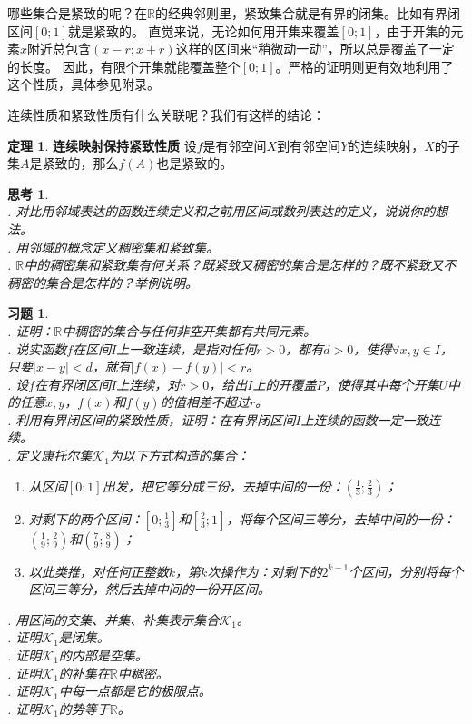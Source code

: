\documentclass[12pt,UTF8]{ctexbook}
\theoremstyle{definition}
\newtheorem{tm}{定理}[section]
\theoremstyle{plain}
\newtheorem{sk}{思考}[section]
\newtheorem{xt}{习题}[section]
\begin{document}
哪些集合是紧致的呢？在$\mathbb{R}$的经典邻则里，紧致集合就是有界的闭集。比如有界闭区间$[0;1]$就是紧致的。
直觉来说，无论如何用开集来覆盖$[0;1]$，由于开集的元素$x$附近总包含$(x-r;x+r)$这样的区间来“稍微动一动”，所以总是覆盖了一定的长度。
因此，有限个开集就能覆盖整个$[0;1]$。严格的证明则更有效地利用了这个性质，具体参见附录。

连续性质和紧致性质有什么关联呢？我们有这样的结论：
\begin{tm}{\textbf{连续映射保持紧致性质}}
    设$f$是有邻空间$X$到有邻空间$Y$的连续映射，$X$的子集$A$是紧致的，那么$f(A)$也是紧致的。
\end{tm}

\begin{sk}
    \mbox{} \\
    . 对比用邻域表达的函数连续定义和之前用区间或数列表达的定义，说说你的想法。\\
    . 用邻域的概念定义稠密集和紧致集。\\
    . $\mathbb{R}$中的稠密集和紧致集有何关系？既紧致又稠密的集合是怎样的？既不紧致又不稠密的集合是怎样的？举例说明。
\end{sk}

\begin{xt}
    \mbox{} \\
    . 证明：$\mathbb{R}$中稠密的集合与任何非空开集都有共同元素。\\
    . 说实函数$f$在区间$I$上一致连续，是指对任何$r>0$，都有$d>0$，使得$\forall x, y\in I$，只要$|x-y|<d$，就有$|f(x) - f(y)| < r$。\\
    . 设$f$在有界闭区间$I$上连续，对$r>0$，给出$I$上的开覆盖$P$，使得其中每个开集$U$中的任意$x,y$，$f(x)$和$f(y)$的值相差不超过$r$。\\
    . 利用有界闭区间的紧致性质，证明：在有界闭区间$I$上连续的函数一定一致连续。\\
    . 定义康托尔集$\mathcal{K}_1$为以下方式构造的集合：
    \begin{enumerate}
        \item 从区间$[0;1]$出发，把它等分成三份，去掉中间的一份：$\left(\frac{1}{3};\frac{2}{3}\right)$；
        \item 对剩下的两个区间：$\left[0;\frac{1}{3}\right]$和$\left[\frac{2}{3};1\right]$，将每个区间三等分，去掉中间的一份：$\left(\frac{1}{9};\frac{2}{9}\right)$和$\left(\frac{7}{9};\frac{8}{9}\right)$；
        \item 以此类推，对任何正整数$k$，第$k$次操作为：对剩下的$2^{k-1}$个区间，分别将每个区间三等分，然后去掉中间的一份开区间。
    \end{enumerate}
    . 用区间的交集、并集、补集表示集合$\mathcal{K}_1$。\\
    . 证明$\mathcal{K}_1$是闭集。\\
    . 证明$\mathcal{K}_1$的内部是空集。\\
    . 证明$\mathcal{K}_1$的补集在$\mathbb{R}$中稠密。\\
    . 证明$\mathcal{K}_1$中每一点都是它的极限点。\\
    . 证明$\mathcal{K}_1$的势等于$\mathbb{R}$。
\end{xt}
\end{document}
